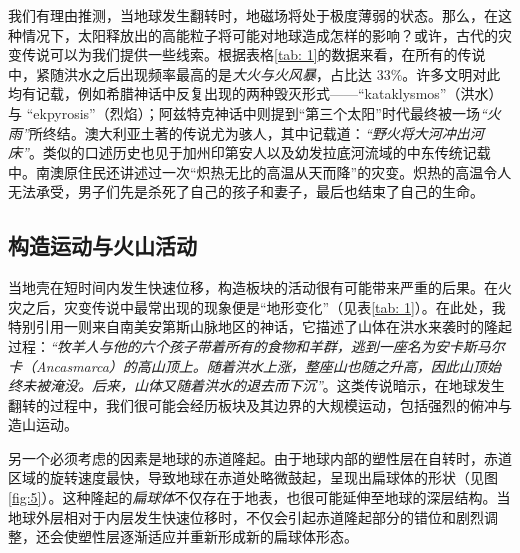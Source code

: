 \documentclass[10pt,twocolumn,letterpaper]{article}
\begin{document}
我们有理由推测，当地球发生翻转时，地磁场将处于极度薄弱的状态。那么，在这种情况下，太阳释放出的高能粒子将可能对地球造成怎样的影响？或许，古代的灾变传说可以为我们提供一些线索。根据表格\ref{tab: 1}的数据来看，在所有的传说中，紧随洪水之后出现频率最高的是\textit{大火与火风暴}，占比达 33\%。许多文明对此均有记载，例如希腊神话中反复出现的两种毁灭形式——“kataklysmos”（洪水）与 “ekpyrosis”（烈焰）\cite{13}；阿兹特克神话中则提到“第三个太阳”时代最终被一场\textit{“火雨”}所终结\cite{14}。澳大利亚土著的传说尤为骇人，其中记载道：\textit{“野火将大河冲出河床”}。类似的口述历史也见于加州印第安人以及幼发拉底河流域的中东传统记载中。南澳原住民还讲述过一次“炽热无比的高温从天而降”的灾变。炽热的高温令人无法承受，男子们先是杀死了自己的孩子和妻子，最后也结束了自己的生命。\cite{15}

\subsection{构造运动与火山活动}
当地壳在短时间内发生快速位移，构造板块的活动很有可能带来严重的后果。在火灾之后，灾变传说中最常出现的现象便是“地形变化”（见表\ref{tab: 1}）。在此处，我特别引用一则来自南美安第斯山脉地区的神话，它描述了山体在洪水来袭时的隆起过程：\textit{“牧羊人与他的六个孩子带着所有的食物和羊群，逃到一座名为安卡斯马尔卡（Ancasmarca）的高山顶上。随着洪水上涨，整座山也随之升高，因此山顶始终未被淹没。后来，山体又随着洪水的退去而下沉”}\cite{17}。这类传说暗示，在地球发生翻转的过程中，我们很可能会经历板块及其边界的大规模运动，包括强烈的俯冲与造山运动。

另一个必须考虑的因素是地球的赤道隆起。由于地球内部的塑性层在自转时，赤道区域的旋转速度最快，导致地球在赤道处略微鼓起，呈现出扁球体的形状（见图\ref{fig:5}）。这种隆起的\textit{扁球体}不仅存在于地表，也很可能延伸至地球的深层结构。当地球外层相对于内层发生快速位移时，不仅会引起赤道隆起部分的错位和剧烈调整，还会使塑性层逐渐适应并重新形成新的扁球体形态。
\end{document}
